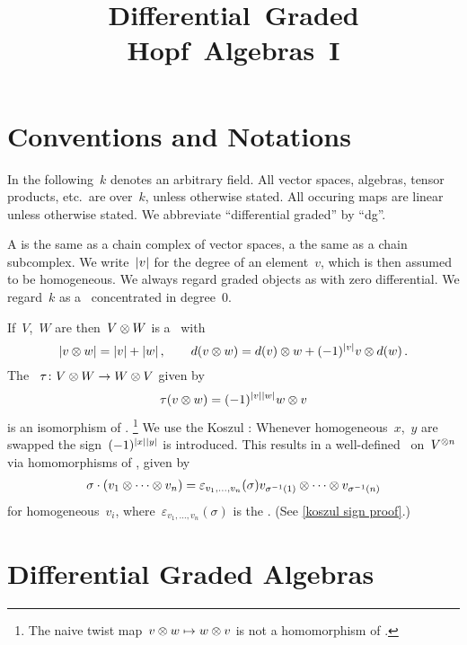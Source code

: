 \documentclass[a4paper,10pt,headings=standardclasses]{scrartcl}
\title{Differential~Graded \\ Hopf~Algebras~I}
\author{}
\date{}
\begin{document}
\maketitle

\vspace{-5em}





\section{Conventions and Notations}
\label{notions and notations}

In the following~$k$ denotes an arbitrary field.
All vector spaces, algebras, tensor products, etc.\ are over~$k$, unless otherwise stated.
All occuring maps are linear unless otherwise stated.
We abbreviate \enquote{differential graded} by \enquote{dg}.

A  is the same as a chain complex of vector spaces, a  the same as a chain subcomplex.
We write~$\lvert v\rvert$ for the degree of an element~$v$, which is then assumed to be homogeneous.
We always regard graded objects as {\dgos} with zero differential.
We regard~$k$ as a~{\dgv} concentrated in degree~$0$.

If~$V$,~$W$ are {\dgvs} then~$V \otimes W$ is a {\dgv}~with
\[
  \lvert v \otimes w\rvert
  =
  \lvert v\rvert + \lvert w\rvert \,,
  \qquad
  d(v \otimes w)
  =
  d(v) \otimes w + (-1)^{\lvert v\rvert} v \otimes d(w) \,.
\]
The ~$\tau \colon V \otimes W \to W \otimes V$ given by
\[
  \tau(v \otimes w)
  =
  (-1)^{\lvert v\rvert \lvert w\rvert}
  w \otimes v
\]
is an isomorphism of {\dgvs}.%
\footnote{The naive twist map~$v \otimes w \mapsto w \otimes v$ is not a homomorphism of {\dgvs}.}
We use the Koszul :
Whenever homogeneous~$x$,~$y$ are swapped the sign~$(-1)^{\lvert x\rvert \lvert y\rvert}$ is introduced.
This results in a well-defined~{} on~$V^{\otimes n}$ via homomorphisms of {\dgvs}, given by
\begin{gather*}
  \sigma \cdot (v_1 \otimes \dotsb \otimes v_n)
  =
  \varepsilon_{v_1, \dotsc, v_n}(\sigma)
  v_{\sigma^{-1}(1)} \otimes \dotsb \otimes v_{\sigma^{-1}(n)}
\end{gather*}
for homogeneous~$v_i$, where~$\varepsilon_{v_1, \dotsc, v_n}(\sigma)$ is the .
(See \cref{koszul sign proof}.)





\section{Differential Graded Algebras}
\end{document}
